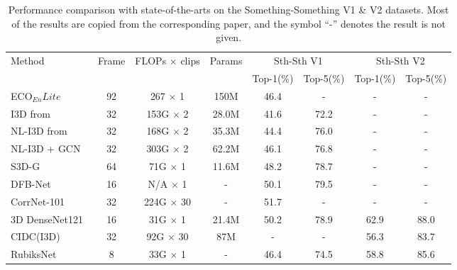 \documentclass[journal]{IEEEtran}
\begin{document}
\begin{table*}
\caption{Performance comparison with state-of-the-arts on the Something-Something V1 \& V2 datasets. Most of the results are copied from the corresponding paper, and the symbol ``-” denotes the result is not given.}
\label{tab:sota}
\centering
\begin{tabular}{l|c|c|c|c|c|c|c}
\hline
Method                          & Frame & FLOPs $\times$ clips      & Params & \multicolumn{2}{c}{Sth-Sth V1} & \multicolumn{2}{c}{Sth-Sth V2} \\
                                      &       &                           &       & Top-1(\%)          & Top-5(\%)          & Top-1(\%)          & Top-5(\%)  \\ \hline
ECO$_{En}Lite$~\cite{zolfaghari2018eco}       & 92    & 267 $\times$ 1            & 150M  & 46.4           & -              & -              & -              \\
I3D from~\cite{wang2018videos}            & 32    & 153G $\times$ 2  & 28.0M & 41.6           & 72.2           & -              & -              \\
NL-I3D from~\cite{wang2018videos}         & 32    & 168G $\times$ 2  & 35.3M & 44.4           & 76.0           & -        & -              \\
NL-I3D + GCN~\cite{wang2018videos}    & 32    & 303G $\times$ 2  & 62.2M & 46.1           & 76.8           & -         & -              \\
S3D-G~\cite{xie2018rethinking}   & 64    & 71G $\times$ 1   & 11.6M & 48.2           & 78.7           & -              & -              \\
DFB-Net~\cite{martinez2019action}   & 16    & N/A $\times$ 1   & -     & 50.1           & 79.5           & -              & -              \\
CorrNet-101~\cite{wang2020video}   & 32    & 224G $\times$ 30   & -     & 51.7           & -           & -              & -              \\
3D DenseNet121~\cite{zhou2020spatiotemporal}  & 16    & 31G $\times$ 1   & 21.4M     & 50.2           & 78.9           & 62.9              & 88.0              \\
CIDC(I3D)~\cite{li2020directional}  & 32    & 92G $\times$ 30   & 87M     & -           & -           & 56.3              & 83.7              \\
RubiksNet~\cite{fan2020rubiksnet}   & 8    & 33G $\times$ 1   & -     & 46.4           & 74.5           & 58.8              & 85.6              \\

\end{tabular}
\end{table*}
\end{document}
